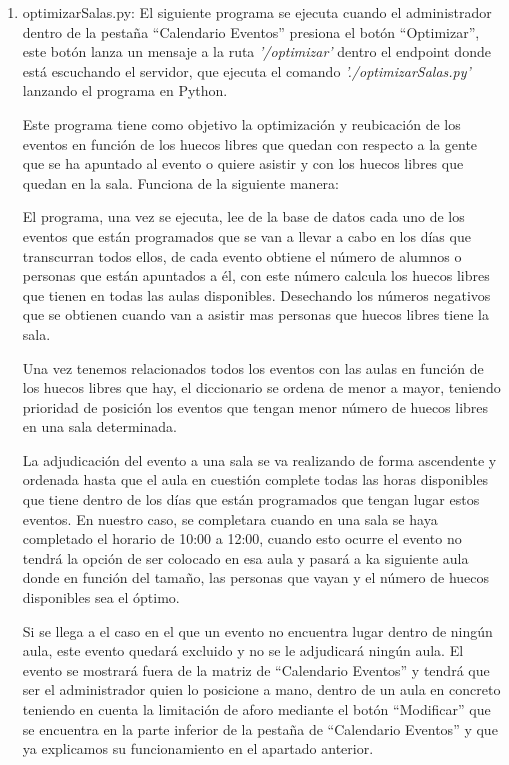 \documentclass[a4paper, 12pt]{book}
\begin{document}
\begin{enumerate}
  	
  	\item optimizarSalas.py: El siguiente programa se ejecuta cuando el administrador dentro de la pestaña ``Calendario Eventos'' presiona el botón ``Optimizar'', este botón lanza un mensaje a la ruta \textit{'/optimizar'} dentro el endpoint donde está escuchando el servidor, que ejecuta el comando \textit{'./optimizarSalas.py'} lanzando el programa en Python. 
  	
  	Este programa tiene como objetivo la optimización y reubicación de los eventos en función de los huecos libres que quedan con respecto a la gente que se ha apuntado al evento o quiere asistir y con los huecos libres que quedan en la sala. Funciona de la siguiente manera:
  	
  	El programa, una vez se ejecuta, lee de la base de datos cada uno de los eventos que están programados que se van a llevar a cabo en los días que transcurran todos ellos, de cada evento obtiene el número de alumnos o personas que están apuntados a él, con este número calcula los huecos libres que tienen en todas las aulas disponibles. Desechando los números negativos que se obtienen cuando van a asistir mas personas que huecos libres tiene la sala.
  	
  	Una vez tenemos relacionados todos los eventos con las aulas en función de los huecos libres que hay, el diccionario se ordena de menor a mayor, teniendo prioridad de posición los eventos que tengan menor número de huecos libres en una sala determinada.
  	 
  	La adjudicación del evento a una sala se va realizando de forma ascendente y ordenada hasta que el aula en cuestión complete todas las horas disponibles que tiene dentro de los días que están programados que tengan lugar estos eventos. En nuestro caso, se completara cuando en una sala se haya completado el horario de 10:00 a 12:00, cuando esto ocurre el evento no tendrá la opción de ser colocado en esa aula y pasará a ka siguiente aula donde en función del tamaño, las personas que vayan y el número de huecos disponibles sea el óptimo.
  	
  	Si se llega a el caso en el que un evento no encuentra lugar dentro de ningún aula, este evento quedará excluido y no se le adjudicará ningún aula. El evento se mostrará fuera de la matriz de ``Calendario Eventos''  y tendrá que ser el administrador quien lo posicione a mano, dentro de un aula en concreto teniendo en cuenta la limitación de aforo mediante el botón ``Modificar'' que se encuentra en la parte inferior de la pestaña de ``Calendario Eventos'' y que ya explicamos su funcionamiento en el apartado anterior.
	\end{enumerate}
\end{document}
